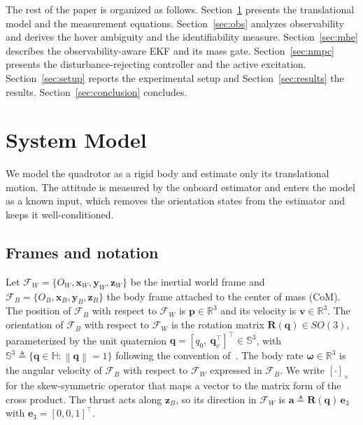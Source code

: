 \documentclass[lettersize,journal]{IEEEtran}
\newcommand{\R}{\mathbb{R}}
\newcommand{\SOg}{SO(3)}
\newcommand{\norm}[1]{\left\| #1 \right\|}
\newcommand{\vect}[1]{\bm{#1}}
\newcommand{\mat}[1]{\mathbf{#1}}
\begin{document}
The rest of the paper is organized as follows. Section~\ref{sec:model}
presents the translational model and the measurement equations.
Section~\ref{sec:obs} analyzes observability and derives the hover ambiguity and
the identifiability measure. Section~\ref{sec:mhe} describes the
observability-aware EKF and its mass gate. Section~\ref{sec:nmpc} presents the
disturbance-rejecting controller and the active excitation.
Section~\ref{sec:setup} reports the experimental setup and
Section~\ref{sec:results} the results. Section~\ref{sec:conclusion} concludes.

\section{System Model}\label{sec:model}

We model the quadrotor as a rigid body and estimate only its translational
motion. The attitude is measured by the onboard estimator and enters the model
as a known input, which removes the orientation states from the estimator and
keeps it well-conditioned.

\subsection{Frames and notation}
Let $\mathcal{F}_W=\{O_W,\vect{x}_W,\vect{y}_W,\vect{z}_W\}$ be the inertial
world frame and $\mathcal{F}_B=\{O_B,\vect{x}_B,\vect{y}_B,\vect{z}_B\}$ the body
frame attached to the center of mass (CoM). The position of $\mathcal{F}_B$ with
respect to $\mathcal{F}_W$ is $\vect{p}\in\R^3$ and its velocity is
$\vect{v}\in\R^3$. The orientation of $\mathcal{F}_B$ with respect to
$\mathcal{F}_W$ is the rotation matrix $\mat{R}(\vect{q})\in\SOg$, parameterized
by the unit quaternion
$\vect{q}=[q_0,\ \vect{q}_v^{\!\top}]^{\!\top}\in\mathbb{S}^3$, with
$\mathbb{S}^3\triangleq\{\vect{q}\in\mathbb{H}:\norm{\vect{q}}=1\}$ following the
convention of~\cite{shuster1993survey}. The body rate $\vect{\omega}\in\R^3$ is
the angular velocity of $\mathcal{F}_B$ with respect to $\mathcal{F}_W$ expressed
in $\mathcal{F}_B$. We write $[\cdot]_\times$ for the skew-symmetric operator
that maps a vector to the matrix form of the cross product. The thrust acts
along $\vect{z}_B$, so its direction in $\mathcal{F}_W$ is
$\vect{a}\triangleq\mat{R}(\vect{q})\,\vect{e}_3$ with
$\vect{e}_3=[0,0,1]^{\!\top}$.
\end{document}
